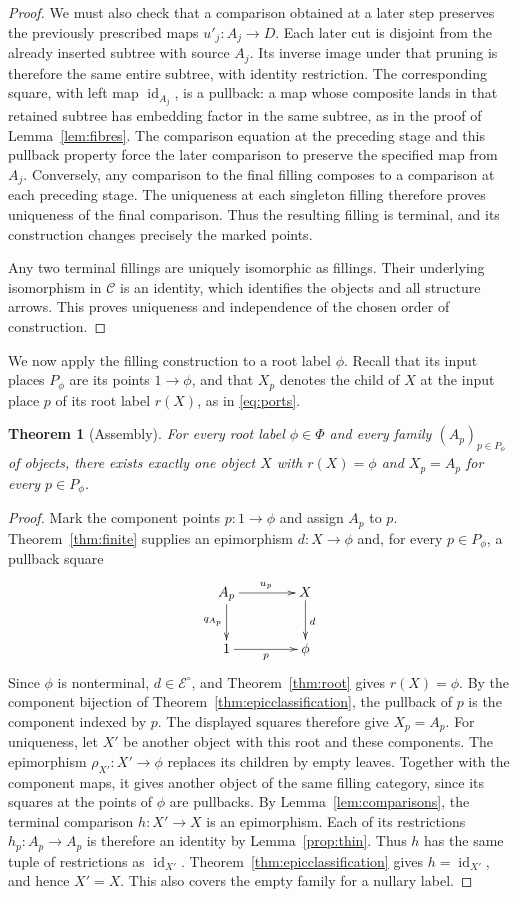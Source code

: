 \documentclass[11pt,a4paper]{article}
\theoremstyle{plain}
\newtheorem{theorem}{Theorem}[section]
\theoremstyle{definition}
\theoremstyle{remark}
\newcommand{\C}{\mathcal C}
\newcommand{\Icat}{\mathcal E^\circ}
\newcommand{\one}{1}
\newcommand{\id}{\operatorname{id}}
\begin{document}
\begin{proof}
We must also check that a comparison obtained at a later step
preserves the previously prescribed maps $u'_j:A_j\to D$. Each later
cut is disjoint from the already inserted subtree with source $A_j$.
Its inverse image under that pruning is therefore the same entire
subtree, with identity restriction. The corresponding square, with
left map $\id_{A_j}$, is a pullback: a map whose composite lands
in that retained subtree has embedding factor in the same subtree,
as in the proof of Lemma~\ref{lem:fibres}. The comparison equation
at the preceding stage and this pullback property force the later
comparison to preserve the specified map from $A_j$. Conversely, any comparison to the final
filling composes to a comparison at each preceding stage. The
uniqueness at each singleton filling therefore proves uniqueness
of the final comparison. Thus the resulting filling is terminal,
and its construction changes precisely the marked points.

Any two terminal fillings are uniquely isomorphic as fillings.
Their underlying isomorphism in $\C$ is an identity, which identifies
the objects and all structure arrows. This proves uniqueness and
independence of the chosen order of construction.
\end{proof}

We now apply the filling construction to a root label $\phi$.
Recall that its input places $P_\phi$ are its points
$\one\to\phi$, and that $X_p$ denotes the child of $X$ at
the input place $p$ of its root label $r(X)$, as in
\eqref{eq:ports}.
\begin{theorem}[Assembly]\label{thm:assembly}
For every root label $\phi\in\Phi$ and every family
$(A_p)_{p\in P_\phi}$ of objects, there exists exactly one
object $X$ with $r(X)=\phi$ and $X_p=A_p$ for every
$p\in P_\phi$.
\end{theorem}
\begin{proof}
Mark the component points $p:\one\to\phi$
and assign $A_p$ to $p$. Theorem~\ref{thm:finite} supplies an
epimorphism $d:X\to\phi$ and, for every $p\in P_\phi$, a
pullback square
\[
 \xymatrix@C=4em@R=2.5em{
A_p\ar[r]^{u_p}\ar[d]_{q_{A_p}}&X\ar[d]^d\\
 \one\ar[r]_p&\phi
 }
\]
Since $\phi$ is nonterminal, $d\in\Icat$, and
Theorem~\ref{thm:root} gives $r(X)=\phi$. By the component bijection
of Theorem~\ref{thm:epicclassification}, the pullback of $p$ is
the component indexed by $p$. The displayed squares therefore give
$X_p=A_p$.
For uniqueness, let $X'$ be another object with this root and
these components. The epimorphism $\rho_{X'}:X'\to\phi$
replaces its children by empty leaves. Together with the
component maps, it gives another object of the same filling
category, since its squares at the points of $\phi$ are
pullbacks. By Lemma~\ref{lem:comparisons}, the terminal
comparison $h:X'\to X$ is an epimorphism. Each of its
restrictions $h_p:A_p\to A_p$ is therefore an identity by
Lemma~\ref{prop:thin}. Thus $h$ has the same tuple of
restrictions as $\id_{X'}$. Theorem~\ref{thm:epicclassification}
gives $h=\id_{X'}$, and hence $X'=X$. This also covers the
empty family for a nullary label.

\end{proof}
\end{document}
